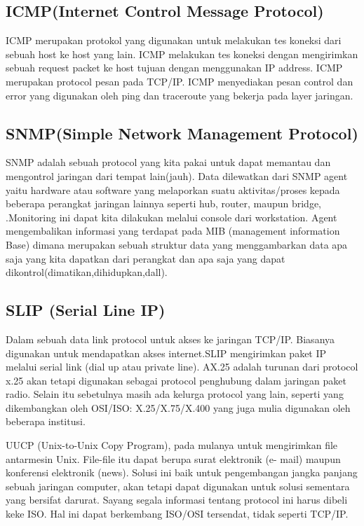 \subsection{ICMP(Internet Control Message Protocol)}
ICMP merupakan protokol yang digunakan untuk melakukan tes koneksi dari sebuah host ke host yang lain.
ICMP melakukan tes koneksi dengan mengirimkan sebuah request packet ke host tujuan dengan menggunakan IP address.
ICMP merupakan protocol pesan pada TCP/IP. ICMP menyediakan pesan control dan error yang digunakan oleh ping dan traceroute yang bekerja pada layer jaringan.

\subsection{SNMP(Simple Network Management Protocol)}
SNMP adalah sebuah protocol yang kita pakai untuk  dapat memantau dan mengontrol jaringan dari tempat lain(jauh). Data dilewatkan dari 
SNMP agent yaitu hardware atau software yang melaporkan suatu aktivitas/proses kepada beberapa perangkat jaringan lainnya seperti hub, 
router, maupun bridge, .Monitoring ini dapat kita  dilakukan melalui console dari workstation. Agent mengembalikan informasi yang 
terdapat pada MIB (management information Base) dimana merupakan sebuah struktur data yang menggambarkan data apa saja yang kita 
dapatkan  dari perangkat dan apa  saja yang dapat dikontrol(dimatikan,dihidupkan,dall).

\subsection{SLIP (Serial Line IP)}
Dalam sebuah data link protocol untuk akses ke jaringan TCP/IP. Biasanya digunakan untuk mendapatkan akses internet.SLIP mengirimkan 
paket IP melalui serial link (dial up atau private line). AX.25 adalah turunan dari protocol x.25 akan tetapi digunakan sebagai protocol 
penghubung dalam jaringan paket radio. Selain itu sebetulnya masih ada kelurga protocol yang lain, seperti yang dikembangkan oleh 
OSI/ISO: X.25/X.75/X.400 yang juga mulia digunakan oleh beberapa institusi.

UUCP (Unix-to-Unix Copy Program), pada mulanya untuk mengirimkan file antarmesin Unix. File-file itu dapat berupa surat elektronik (e-
mail) maupun konferensi elektronik (news). Solusi ini baik untuk pengembangan jangka panjang sebuah jaringan computer, akan tetapi dapat 
digunakan untuk solusi sementara yang bersifat darurat. Sayang segala informasi tentang protocol ini harus dibeli keke ISO. Hal ini 
dapat berkembang ISO/OSI tersendat, tidak seperti TCP/IP.


